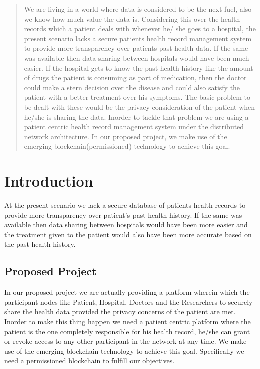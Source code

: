 \documentclass[11pt]{report}
\begin{document}
\begin{abstract}
\par We are living in a world where data is considered to be the next fuel, also we know how much value the data is. Considering this over the health records which a patient deals with whenever he/ she goes to a hospital, the present scenario lacks a secure  patients health
record management system to provide more transparency over patients past health data. If the same was available then data sharing between hospitals would have been much easier. If the hospital gets to know the past health history like the amount of drugs the patient is consuming as part of medication, then the doctor could make a stern decision over the disease and could also satisfy the patient with a better treatment over his symptoms. The basic problem to be dealt with these would be the privacy consideration of the patient when he/she is sharing the data. Inorder to tackle that problem we are using a patient centric health record management system under the distributed network architecture. In our proposed project, we make use of the emerging blockchain(permissioned) technology to achieve this goal.   
\end{abstract}
 
\newpage
\tableofcontents
\newpage
{}

\listoffigures
\newpage


\chapter {Introduction}  


At the present scenario we lack a secure database of patients health records to provide more transparency over patient’s past health history. If the same was available then data sharing between hospitals would have been more easier and the treatment given to the patient would also have been more accurate based on the past health history.


\section{Proposed Project}

\par In our proposed project we are actually providing a platform wherein which the participant nodes like Patient, Hospital, Doctors and the Researchers to securely share the health data provided the privacy concerns of the patient are met. Inorder to make this thing happen we need a patient centric platform where the patient is the one completely responsible for his health record, he/she can grant or revoke access to any other participant in the network at any time. We make use of the emerging blockchain technology to achieve this goal. Specifically we need a permissioned blockchain to fulfill our objectives. 
\end{document}

